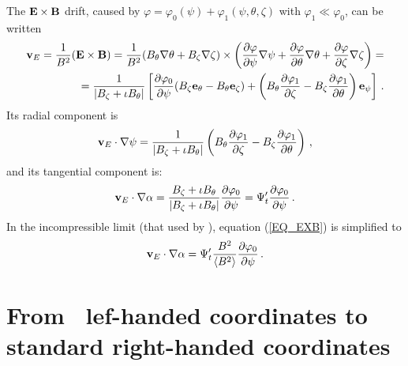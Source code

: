 The $\mathbf{E}\times\mathbf{B}$ drift, caused by $\varphi=\varphi_0(\psi)+\varphi_1(\psi,\theta,\zeta)$ with $\varphi_1\ll\varphi_0$, can be written
\begin{eqnarray}
{\mathbf{v}}_E = \frac{1}{B^2}(\mathbf{E} \times \mathbf{B}) = \frac{1}{B^2}(B_\theta\mathbf{\nabla}\theta+B_\zeta\mathbf{\nabla}\zeta)\times \left(\frac{\partial \varphi}{\partial \psi}\mathbf{\nabla} \psi+\frac{\partial \varphi}{\partial \theta}\mathbf{\nabla}\theta+\frac{\partial \varphi}{\partial \zeta}\mathbf{\nabla}\zeta\right) = \nonumber\\= \frac{1}{|B_\zeta+\iota B_\theta|}\left[\frac{\partial \varphi_0}{\partial \psi}(B_\zeta\mathbf{e}_\theta-B_\theta\mathbf{e}_\zeta) + \left(B_\theta\frac{\partial \varphi_1}{\partial \zeta}-B_\zeta\frac{\partial \varphi_1}{\partial \theta}\right)\mathbf{e}_\psi\right]\,.
\end{eqnarray}
Its radial component is
\begin{eqnarray}
{\mathbf{v}}_E\cdot \mathbf{\nabla}\psi= \frac{1}{|B_\zeta+\iota B_\theta|}\left(B_\theta\frac{\partial \varphi_1}{\partial \zeta}-B_\zeta\frac{\partial \varphi_1}{\partial \theta}\right)\,,
\end{eqnarray}
and its tangential component is:
\begin{eqnarray}
{\mathbf{v}}_E\cdot\mathbf{\nabla} \alpha = \frac{B_\zeta+\iota B_\theta}{|B_\zeta+\iota B_\theta|}\frac{\partial \varphi_0}{\partial\psi}=\Psi_t'\frac{\partial \varphi_0}{\partial\psi}\,.\label{EQ_EXB}
\end{eqnarray}
In the incompressible limit (that used by \DKES), equation (\ref{EQ_EXB}) is simplified to
\begin{eqnarray}
{\mathbf{v}}_E\cdot\mathbf{\nabla} \alpha = \Psi_t'\frac{B^2}{\left\langle{B^2}\right\rangle}\frac{\partial \varphi_0}{\partial \psi}\,.\label{EQ_INCOMP}
\end{eqnarray}



\section{From \VMEC~lef-handed coordinates to standard right-handed coordinates}\label{SEC_VMEC}

